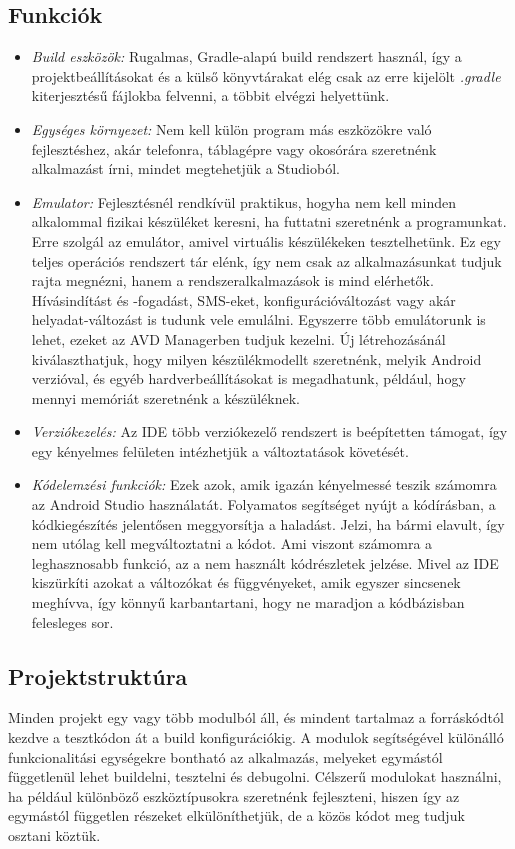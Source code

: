 \subsection{Funkciók}
\begin{itemize}
	\item \emph{Build eszközök:} Rugalmas, Gradle-alapú build rendszert használ, így a projektbeállításokat és a külső könyvtárakat elég csak az erre kijelölt \emph{.gradle} kiterjesztésű fájlokba felvenni, a többit elvégzi helyettünk.
	\item \emph{Egységes környezet:} Nem kell külön program más eszközökre való fejlesztéshez, akár telefonra, táblagépre vagy okosórára szeretnénk alkalmazást írni, mindet megtehetjük a Studioból. 
	\item \emph{Emulator:} Fejlesztésnél rendkívül praktikus, hogyha nem kell minden alkalommal fizikai készüléket keresni, ha futtatni szeretnénk a programunkat. Erre szolgál az emulátor, amivel virtuális készülékeken tesztelhetünk. Ez egy teljes operációs rendszert tár elénk, így nem csak az alkalmazásunkat tudjuk rajta megnézni, hanem a rendszeralkalmazások is mind elérhetők. Hívásindítást és -fogadást, SMS-eket, konfigurációváltozást vagy akár helyadat-változást is tudunk vele emulálni. Egyszerre több emulátorunk is lehet, ezeket az AVD Managerben tudjuk kezelni. Új létrehozásánál kiválaszthatjuk, hogy milyen készülékmodellt szeretnénk, melyik Android verzióval, és egyéb hardverbeállításokat is megadhatunk, például, hogy mennyi memóriát szeretnénk a készüléknek. 
	\item \emph{Verziókezelés:} Az IDE több verziókezelő rendszert is beépítetten támogat, így egy kényelmes felületen intézhetjük a változtatások követését. 
	\item \emph{Kódelemzési funkciók:} Ezek azok, amik igazán kényelmessé teszik számomra az Android Studio használatát. Folyamatos segítséget nyújt a kódírásban, a kódkiegészítés jelentősen meggyorsítja a haladást. Jelzi, ha bármi elavult, így nem utólag kell megváltoztatni a kódot. Ami viszont számomra a leghasznosabb funkció, az a nem használt kódrészletek jelzése. Mivel az IDE kiszürkíti azokat a változókat és függvényeket, amik egyszer sincsenek meghívva, így könnyű karbantartani, hogy ne maradjon a kódbázisban felesleges sor.
\end{itemize}

\subsection{Projektstruktúra}
Minden projekt egy vagy több modulból áll, és mindent tartalmaz a forráskódtól kezdve a tesztkódon át a build konfigurációkig. A modulok segítségével különálló funkcionalitási egységekre bontható az alkalmazás, melyeket egymástól függetlenül lehet buildelni, tesztelni és debugolni. \cite{ProjectStructure}
Célszerű modulokat használni, ha például különböző eszköztípusokra szeretnénk fejleszteni, hiszen így az egymástól független részeket elkülöníthetjük, de a közös kódot meg tudjuk osztani köztük. 

